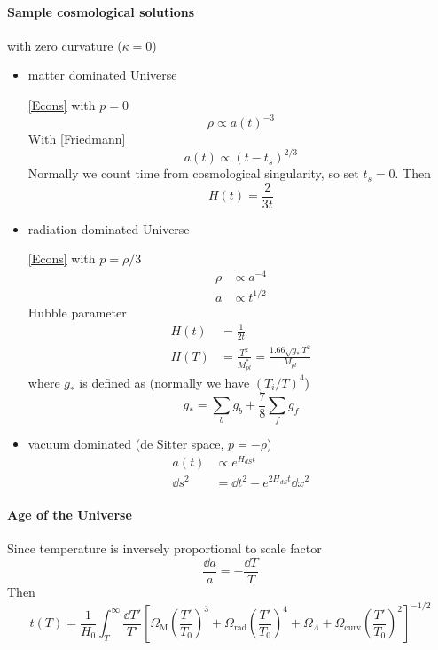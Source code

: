 \documentclass[12pt, a4paper, DIV=15]{article}
\numberwithin{equation}{section}
\begin{document}
\paragraph{Sample cosmological solutions} with zero curvature ($\kappa = 0$)
\begin{itemize}
   \item matter dominated Universe 

      \eqref{Econs} with $p=0$ 
      \begin{equation}
         \rho \propto a(t)^{-3}
      \end{equation}
      With \eqref{Friedmann}
      \begin{equation}
         a(t) \propto (t-t_s)^{2/3}
      \end{equation}
      Normally we count time from cosmological singularity, so set $t_s = 0$. Then
      \begin{equation}
         H(t) = \frac{2}{3t}
      \end{equation}

   \item radiation dominated Universe
      
      \eqref{Econs} with $p=\rho/3$
      \begin{align}
         \rho &\propto a^{-4} \\
         a &\propto t^{1/2}
      \end{align}
      Hubble parameter
      \begin{align}
         H(t) &= \frac{1}{2t} \\
         H(T) &= \frac{T^2}{M^*_{pl}} = \frac{1.66 \sqrt{g_*}T^2}{M_{pl}}
      \end{align}
      where $g_*$ is defined as (normally we have $(T_i/T)^4$)
      \begin{equation}
         g_* = \sum_b g_b + \frac{7}{8} \sum_f g_f
      \end{equation}

   \item vacuum dominated (de Sitter space, $p = -\rho$)
         \begin{align}
            a(t) &\propto e^{H_{dS} t} \\
				\dd{s^2} &= \dd{t^2} - e^{2H_{dS}t} \dd{x^2}
         \end{align}

\end{itemize}

\paragraph{Age of the Universe}
Since temperature is inversely proportional to scale factor
\begin{equation}
   \frac{\dd{a}}{a} = - \frac{\dd{T}}{T} 
\end{equation}
Then
\begin{equation}
	t(T) = \frac{1}{H_0} \int_T^\infty \frac{\dd{T'}}{T'} \left[ \Omega_\text{M} \left( \frac{T'}{T_0} \right)^3 + \Omega_\text{rad} \left( \frac{T'}{T_0} \right)^4 + \Omega_{\Lambda} + \Omega_\text{curv} \left( \frac{T'}{T_0} \right)^2 \right]^{-1/2}
\end{equation}
\end{document}
